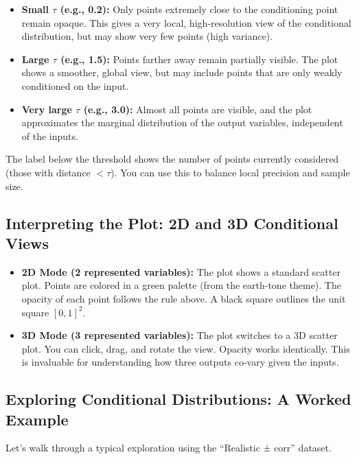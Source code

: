 \documentclass[12pt]{article}
\begin{document}
\begin{itemize}
    \item \textbf{Small \(\tau\) (e.g., 0.2):} Only points extremely close to the conditioning point remain opaque. This gives a very local, high-resolution view of the conditional distribution, but may show very few points (high variance).
    \item \textbf{Large \(\tau\) (e.g., 1.5):} Points farther away remain partially visible. The plot shows a smoother, global view, but may include points that are only weakly conditioned on the input.
    \item \textbf{Very large \(\tau\) (e.g., 3.0):} Almost all points are visible, and the plot approximates the marginal distribution of the output variables, independent of the inputs.
\end{itemize}

The label below the threshold shows the number of points currently considered (those with distance \(<\tau\)). You can use this to balance local precision and sample size.

\subsection{Interpreting the Plot: 2D and 3D Conditional Views}

\begin{itemize}
    \item \textbf{2D Mode (2 represented variables):} The plot shows a standard scatter plot. Points are colored in a green palette (from the earth-tone theme). The opacity of each point follows the rule above. A black square outlines the unit square \([0,1]^2\).
    \item \textbf{3D Mode (3 represented variables):} The plot switches to a 3D scatter plot. You can click, drag, and rotate the view. Opacity works identically. This is invaluable for understanding how three outputs co-vary given the inputs.
\end{itemize}

\subsection{Exploring Conditional Distributions: A Worked Example}

Let's walk through a typical exploration using the “Realistic ± corr” dataset.
\end{document}
